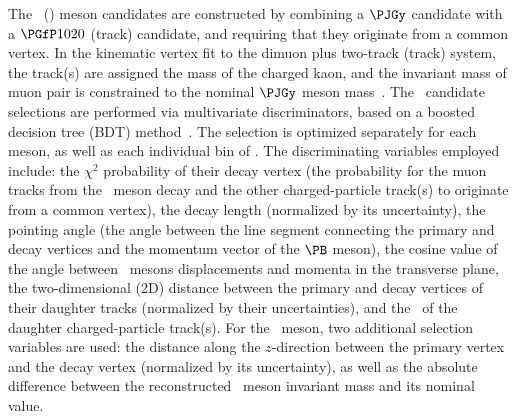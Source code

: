The \PBzs\ (\PBp) meson candidates are constructed by combining a $\PJGy$ candidate with a $\Pphi$ (track) candidate, and requiring that they originate from a common vertex. In the kinematic vertex fit to the dimuon plus two-track (track) system, the track(s) are assigned the mass of the charged kaon, and the invariant mass of muon pair is constrained %
to the nominal $\PJGy$ meson mass~\cite{pdg2018}.
%
%
The \PB\ candidate selections are performed via multivariate discriminators, based on a boosted decision tree (BDT) method~\cite{Hocker:2007ht}. The selection is optimized separately for each meson, as well as each individual bin of \pt. 
%  
The discriminating variables employed include:
the $\chi^{2}$ probability of their decay vertex (the probability for the muon tracks from the \PJGy\ meson decay and the other charged-particle track(s) to originate from a common vertex), the decay length (normalized by its uncertainty), the pointing angle (the angle between the line segment connecting the primary and decay vertices and the momentum vector of the $\PB$ meson), the cosine value of the angle between \PB\ mesons displacements and momenta in the transverse plane, the two-dimensional (2D) distance between the primary and decay vertices of their daughter tracks (normalized by their uncertainties), and the \pt\ of the daughter charged-particle track(s). 
%
For the \PBzs\ meson, two additional selection variables are used: 
the distance along the $z$-direction between the primary vertex and the decay 
vertex (normalized by its uncertainty), as well as the absolute difference 
between the reconstructed  \Pphi\ meson invariant mass and its nominal value.


